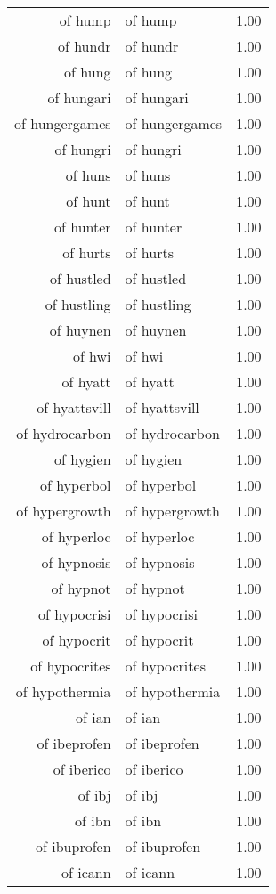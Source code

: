 \begin{table}[ht]
\begin{tabular}{rlr}
  of hump & of hump & 1.00 \\ 
  of hundr & of hundr & 1.00 \\ 
  of hung & of hung & 1.00 \\ 
  of hungari & of hungari & 1.00 \\ 
  of hungergames & of hungergames & 1.00 \\ 
  of hungri & of hungri & 1.00 \\ 
  of huns & of huns & 1.00 \\ 
  of hunt & of hunt & 1.00 \\ 
  of hunter & of hunter & 1.00 \\ 
  of hurts & of hurts & 1.00 \\ 
  of hustled & of hustled & 1.00 \\ 
  of hustling & of hustling & 1.00 \\ 
  of huynen & of huynen & 1.00 \\ 
  of hwi & of hwi & 1.00 \\ 
  of hyatt & of hyatt & 1.00 \\ 
  of hyattsvill & of hyattsvill & 1.00 \\ 
  of hydrocarbon & of hydrocarbon & 1.00 \\ 
  of hygien & of hygien & 1.00 \\ 
  of hyperbol & of hyperbol & 1.00 \\ 
  of hypergrowth & of hypergrowth & 1.00 \\ 
  of hyperloc & of hyperloc & 1.00 \\ 
  of hypnosis & of hypnosis & 1.00 \\ 
  of hypnot & of hypnot & 1.00 \\ 
  of hypocrisi & of hypocrisi & 1.00 \\ 
  of hypocrit & of hypocrit & 1.00 \\ 
  of hypocrites & of hypocrites & 1.00 \\ 
  of hypothermia & of hypothermia & 1.00 \\ 
  of ian & of ian & 1.00 \\ 
  of ibeprofen & of ibeprofen & 1.00 \\ 
  of iberico & of iberico & 1.00 \\ 
  of ibj & of ibj & 1.00 \\ 
  of ibn & of ibn & 1.00 \\ 
  of ibuprofen & of ibuprofen & 1.00 \\ 
  of icann & of icann & 1.00 \\ 

\end{tabular}
\end{table}

